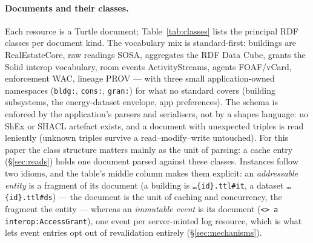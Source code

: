 \documentclass[11pt,a4paper]{article}
\theoremstyle{remark}
\newcommand{\code}[1]{\texttt{#1}}
\begin{document}
\paragraph{Documents and their classes.} Each resource is a Turtle document;
Table~\ref{tab:classes} lists the principal RDF classes per document kind.
The vocabulary mix is standard-first: buildings are RealEstateCore, raw
readings SOSA, aggregates the RDF Data Cube, grants the Solid interop
vocabulary, room events ActivityStreams, agents FOAF/vCard, enforcement WAC,
lineage PROV --- with three small application-owned namespaces
(\code{bldg:}, \code{cons:}, \code{gran:}) for what no standard covers
(building subsystems, the energy-dataset envelope, app preferences). The
schema is enforced by the application's parsers and serialisers, not by a
shapes language: no ShEx or SHACL artefact exists, and a document with
unexpected triples is read leniently (unknown triples survive a
read--modify--write untouched). For this paper the class structure matters
mainly as the unit of parsing: a cache entry (\S\ref{sec:reads}) holds one
document parsed against these classes. Instances follow two idioms, and the
table's middle column makes them explicit: an \emph{addressable entity} is a
fragment of its document (a building is \code{\ldots\{id\}.ttl\#it}, a
dataset \code{\ldots\{id\}.ttl\#ds}) --- the document is the unit of caching
and concurrency, the fragment the entity --- whereas an \emph{immutable
event} is its document (\code{<> a interop:AccessGrant}), one event per
server-minted log resource, which is what lets event entries opt out of
revalidation entirely (\S\ref{sec:mechanisms}).
\end{document}
